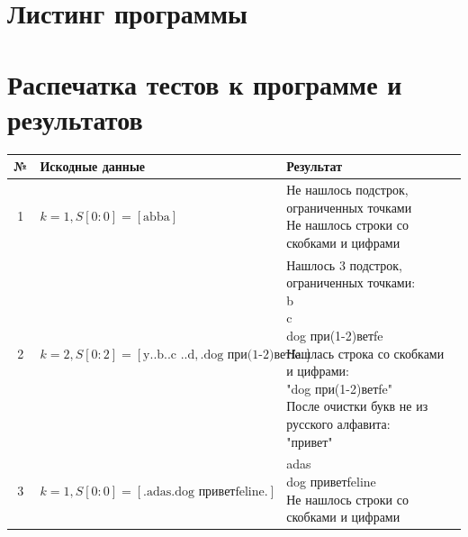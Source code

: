 \newpage
\section{Листинг программы}



\newpage
\section{Распечатка тестов к программе и результатов}

\begin{center}
    \begin{tabular}{|c|l|l|}
        \hline
        № & Искодные данные & Результат \\\hline
        1 &
        $k = 1, S[0:0] = [\text{abba}]$ &
        \makecell[l]{
            Не нашлось подстрок, ограниченных точками \\
            Не нашлось строки со скобками и цифрами
        }\\\hline
        2 &
        $k = 2, S[0:2] = [\text{y..b..c ..d}, \text{.dog
        при(1-2)ветfe.}]$ &
        \makecell[l]{
            Нашлось 3 подстрок, ограниченных точками: \\
            b \\
            c  \\
            dog при(1-2)ветfe \\
            Нашлась строка со скобками и цифрами: \\
            "dog при(1-2)ветfe" \\
            После очистки букв не из русского алфавита: \\
            "привет"
        }\\\hline
        3 &
        $k = 1, S[0:0] = [\text{.adas.dog приветfeline.}]$ &
        \makecell[l]{
            adas \\
            dog приветfeline \\
            Не нашлось строки со скобками и цифрами
        }\\\hline
    \end{tabular}
\end{center}


